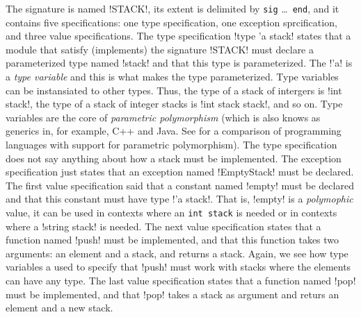 \documentclass[workingdraft]{usetex-v1}
\begin{document}
The signature is named !STACK!, its extent is delimited by
\texttt{sig} \ldots\ \texttt{end}, and it contains five
specifications: one type specification, one exception sprcification,
and three value specifications.  The type specification 
!type 'a stack! states that a module that satisfy (implements) the signature
!STACK! must declare a parameterized type named !stack! and that this
type is parameterized.  The !'a! is a \emph{type variable} and this is
what makes the type parameterized.  Type variables can be instansiated
to other types.  Thus, the type of a stack of intergers is 
!int stack!, the type of a stack of integer stacks is !int stack stack!,
and so on. Type variables are the core of \emph{parametric
  polymorphism} (which is also knows as generics in, for example, C++
and Java.  See \cite{garcia03:generics} for a comparison of
programming languages with support for parametric polymorphism).  The
type specification does not say anything about how a stack must be
implemented.  The exception specification just states that an
exception named !EmptyStack! must be declared.  The first value
specification said that a constant named !empty! must be declared and
that this constant must have type !'a stack!.  That is, !empty! is a
\emph{polymophic} value, it can be used in contexts where an
\texttt{int stack} is needed or in contexts where a !string stack! is
needed.  The next value specification states that a function named
!push! must be implemented, and that this function takes two
arguments: an element and a stack, and returns a stack.  Again, we see
how type variables a used to specify that !push! must work with stacks
where the elements can have any type.  The last value specification
states that a function named !pop! must be implemented, and that !pop!
takes a stack as argument and returs an element and a new stack.
\end{document}
